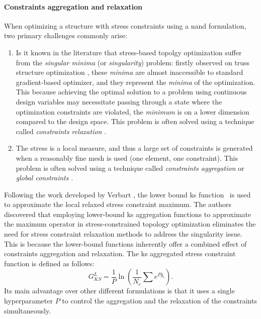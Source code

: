 \paragraph{Constraints aggregation and relaxation}
When optimizing a structure with stress constraints using a \gls{nand} formulation, two primary challenges commonly arise:
\begin{enumerate}[label=(\roman*)]
    \item Is it known in the literature \cite{rozvany_design-dependent_2001,stolpe_models_2003} that stress-based topolgy optimization suffer from the \textit{singular minima} (or \textit{singularity}) problem: firstly observed on truss structure optimization \cite{sved_structural_1968}, these \textit{minima} are almost inaccessible to standard gradient-based optimizer, and they represent the \textit{minima} of the optimization. This because achieving the optimal solution to a problem using continuous design variables may necessitate passing through a state where the optimization constraints are violated, \ie the \textit{minimum} is on a lower dimension compared to the design space. This problem is often solved using a technique called \textit{constraints relaxation} .

    \item The stress is a local measure, and thus a large set of constraints is generated when a reasonably fine mesh is used (one element, one constraint). This problem is often solved using a technique called \textit{constraints aggregation} or \textit{global constraints} .
\end{enumerate} 

Following the work developed by Verbart \etal {}, the lower bound \gls{ks} function~ is used to approximate the local relaxed stress constraint maximum. The authors discovered that employing lower-bound \gls{ks} aggregation functions to approximate the maximum operator in stress-constrained topology optimization eliminates the need for stress constraint relaxation methods to address the singularity issue. This is because the lower-bound functions inherently offer a combined effect of constraints aggregation and relaxation. The \gls{ks} aggregated stress constraint function is defined as follows:
\begin{equation} 
    G_{KS}^L = \frac{1}{P} \ln{\left( \frac{1}{N_e} \sum e^{{P}\bar{g}_i} \right)}.
    \label{eq:03_gksl}
\end{equation}
Its main advantage over other different formulations is that it uses a single hyperparameter $P$ to control the aggregation and the relaxation of the constraints simultaneously.

